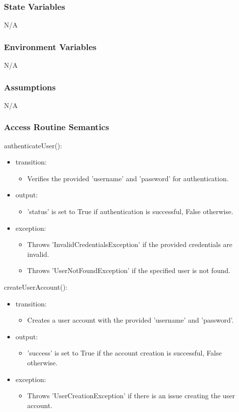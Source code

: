 \documentclass[12pt, titlepage]{article}
\begin{document}
\subsubsection{State Variables}
N/A
\subsubsection{Environment Variables}
N/A
\subsubsection{Assumptions}
N/A
\subsubsection{Access Routine Semantics}

\noindent authenticateUser():
\begin{itemize}
\item transition: \begin{itemize}
    \item Verifies the provided 'username' and 'password' for authentication.
\end{itemize}
\item output: \begin{itemize}
    \item 'status' is set to True if authentication is successful, False otherwise.
\end{itemize} 
\item exception: \begin{itemize}
    \item Throws 'InvalidCredentialsException' if the provided credentials are invalid.
    \item Throws 'UserNotFoundException' if the specified user is not found.
\end{itemize}
\end{itemize}

\noindent createUserAccount():
\begin{itemize}
\item transition: \begin{itemize}
    \item Creates a user account with the provided 'username' and 'password'.
\end{itemize}
\item output: \begin{itemize}
    \item 'success' is set to True if the account creation is successful, False otherwise.
\end{itemize}
\item exception: \begin{itemize}
    \item Throws 'UserCreationException' if there is an issue creating the user account.
\end{itemize}
\end{itemize}
\end{document}
